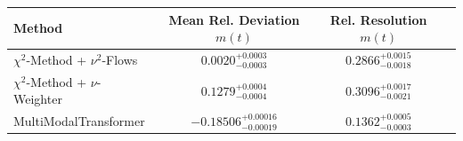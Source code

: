     \begin{tabular}{lccc}
        \toprule
        Method & Mean Rel. Deviation $m(t)$ & Rel. Resolution $m(t)$ \\
        \midrule
        $\chi^2$-Method + $\nu^2$-Flows & $0.0020^{+0.0003}_{-0.0003}$ & $0.2866^{+0.0015}_{-0.0018}$ \\
        $\chi^2$-Method + $\nu$-Weighter & $0.1279^{+0.0004}_{-0.0004}$ & $0.3096^{+0.0017}_{-0.0021}$ \\
        MultiModalTransformer & $-0.18506^{+0.00016}_{-0.00019}$ & $0.1362^{+0.0005}_{-0.0003}$ \\
        \bottomrule
    \end{tabular}